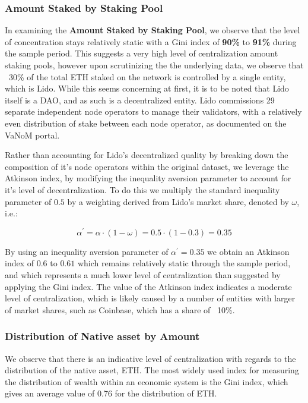 \documentclass[conference]{IEEEtran}
\begin{document}
\subsubsection{Amount Staked by Staking Pool}
In examining the \textbf{Amount Staked by Staking Pool}, we observe that the level of concentration stays relatively static with a Gini index of \textbf{90\%} to \textbf{91\%} during the sample period.  This suggests a very high level of centralization amount staking pools, however upon scrutinizing the the underlying data, we observe that ~30\% of the total ETH staked on the network is controlled by a single entity, which is Lido.  While this seems concerning at first, it is to be noted that Lido itself is a DAO, and as such is a decentralized entity.  Lido commissions 29 separate independent node operators to manage their validators, with a relatively even distribution of stake between each node operator, as documented on the VaNoM portal\cite{lido2023}.

Rather than accounting for Lido's decentralized quality by breaking down the composition of it's node operators within the original dataset, we leverage the Atkinson index, by modifying the inequality aversion parameter to account for it's level of decentralization.  To do this we multiply the standard inequality parameter of $0.5$ by a weighting derived from Lido's market share, denoted by $\omega$, i.e.:

\[\alpha^\prime = \alpha \cdot \left( 1 - \omega \right) = 0.5 \cdot \left( 1 - 0.3 \right) = 0.35\]

By using an inequality aversion parameter of $\alpha^\prime=0.35$ we obtain an Atkinson index of $0.6$ to $0.61$ which remains relatively static through the sample period, and which represents a much lower level of centralization than suggested by applying the Gini index.  The value of the Atkinson index indicates a moderate level of centralization, which is likely caused by a number of entities with larger of market shares, such as Coinbase, which has a share of ~10\%.

\subsubsection{Distribution of Native asset by Amount}

We observe that there is an indicative level of centralization with regards to the distribution of the native asset, ETH.  The most widely used index for measuring the distribution of wealth within an economic system is the Gini index, which gives an average value of 0.76 for the distribution of ETH.
\end{document}
